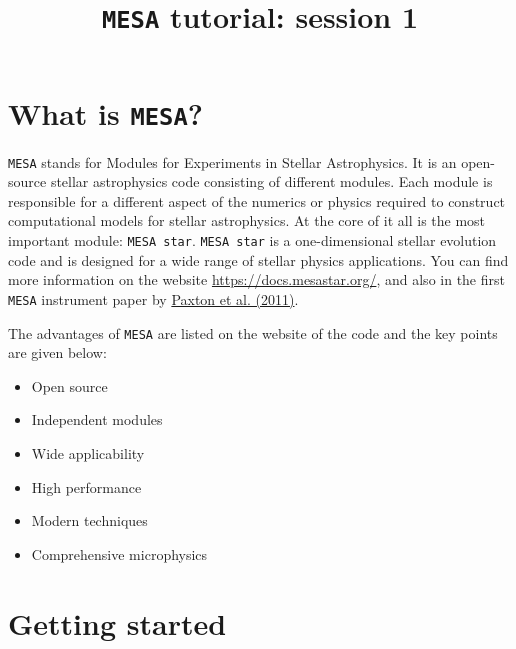 \documentclass[11pt,a4paper]{article}
\begin{document}
\title{\textbf{\texttt{MESA} tutorial: session 1}}
\author{}
\date{}
\maketitle

\section{What is \texttt{MESA}?}

\texttt{MESA} stands for Modules for Experiments in Stellar Astrophysics. It is an open-source stellar astrophysics code consisting of different modules. Each module is responsible for a different aspect of the numerics or physics required to construct computational models for stellar astrophysics. At the core of it all is the most important module: \texttt{MESA star}. \texttt{MESA star} is a one-dimensional stellar evolution code and is designed for a wide range of stellar physics applications. You can find more information on the website \url{https://docs.mesastar.org/}, and also in the first \texttt{MESA} instrument paper by \href{https://ui.adsabs.harvard.edu/abs/2011ApJS..192....3P/abstract}{Paxton et al. (2011)}. 

\bigskip\noindent
The advantages of \texttt{MESA} are listed on the website of the code and the key points are given below:
\begin{itemize}
\item Open source
\item Independent modules
\item Wide applicability
\item High performance
\item Modern techniques
\item Comprehensive microphysics
\end{itemize}


\section{Getting started}

\end{document}
